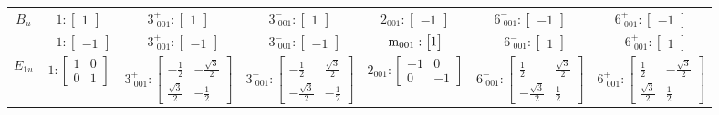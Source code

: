 \documentclass[fleqn,8pt,landscape]{jsarticle}
\begin{document}
\begin{longtable}{ccccccc}
$ B_{u} $ & $ 1:\begin{bmatrix} 1 \end{bmatrix} $ & $ 3^{+}_{\,\,001}:\begin{bmatrix} 1 \end{bmatrix} $ & $ 3^{-}_{\,\,001}:\begin{bmatrix} 1 \end{bmatrix} $ & $ 2{}_{001}:\begin{bmatrix} -1 \end{bmatrix} $ & $ 6^{-}_{\,\,001}:\begin{bmatrix} -1 \end{bmatrix} $ & $ 6^{+}_{\,\,001}:\begin{bmatrix} -1 \end{bmatrix} $ \\
& $ -1:\begin{bmatrix} -1 \end{bmatrix} $ & $ -3^{+}_{\,\,001}:\begin{bmatrix} -1 \end{bmatrix} $ & $ -3^{-}_{\,\,001}:\begin{bmatrix} -1 \end{bmatrix} $ & $ {\rm m}_{001}:\begin{bmatrix} 1 \end{bmatrix} $ & $ -6^{-}_{\,\,001}:\begin{bmatrix} 1 \end{bmatrix} $ & $ -6^{+}_{\,\,001}:\begin{bmatrix} 1 \end{bmatrix} $ \\ \hline
$ E_{1u} $ & $ 1:\begin{bmatrix} 1 & 0 \\ 0 & 1 \end{bmatrix} $ & $ 3^{+}_{\,\,001}:\begin{bmatrix} - \frac{1}{2} & - \frac{\sqrt{3}}{2} \\ \frac{\sqrt{3}}{2} & - \frac{1}{2} \end{bmatrix} $ & $ 3^{-}_{\,\,001}:\begin{bmatrix} - \frac{1}{2} & \frac{\sqrt{3}}{2} \\ - \frac{\sqrt{3}}{2} & - \frac{1}{2} \end{bmatrix} $ & $ 2{}_{001}:\begin{bmatrix} -1 & 0 \\ 0 & -1 \end{bmatrix} $ & $ 6^{-}_{\,\,001}:\begin{bmatrix} \frac{1}{2} & \frac{\sqrt{3}}{2} \\ - \frac{\sqrt{3}}{2} & \frac{1}{2} \end{bmatrix} $ & $ 6^{+}_{\,\,001}:\begin{bmatrix} \frac{1}{2} & - \frac{\sqrt{3}}{2} \\ \frac{\sqrt{3}}{2} & \frac{1}{2} \end{bmatrix} $ \\

\end{longtable}
\end{document}
